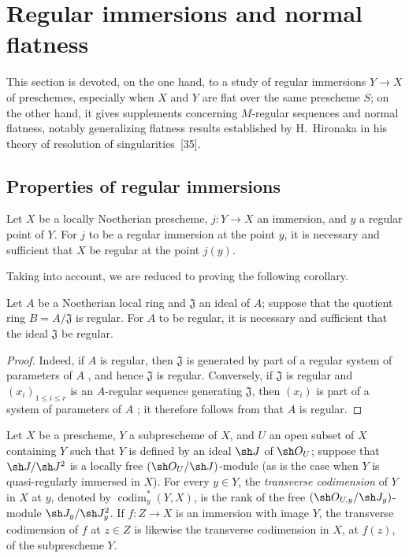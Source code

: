 \section{Regular immersions and normal flatness}
\label{section:IV.19}

This section is devoted, on the one hand, to a study of regular immersions  $Y\to X$ of preschemes, especially when $X$ and $Y$ are flat over the same prescheme $S$; on the other hand, it gives supplements concerning $M$-regular sequences and normal flatness, notably generalizing flatness results established by H.~Hironaka in his theory of resolution of singularities~[35].


\subsection{Properties of regular immersions}
\label{subsection:IV.19.1}


\begin{proposition}[19.1.1]
\label{IV.19.1.1}
Let $X$ be a locally Noetherian prescheme, $j:Y\to X$ an immersion, and $y$ a regular point of $Y$. For $j$ to be a regular immersion at the point $y$, it is necessary and sufficient that $X$ be regular at the point $j(y)$.
\end{proposition}

Taking  into account, we are reduced to proving the following corollary.

\begin{corollary}[19.1.2]
\label{IV.19.1.2}
Let $A$ be a Noetherian local ring and $\mathfrak J$ an ideal of $A$; suppose that the quotient ring $B=A/\mathfrak J$ is regular. For $A$ to be regular, it is necessary and sufficient that the ideal $\mathfrak J$ be regular.
\end{corollary}

\begin{proof}
Indeed, if $A$ is regular, then $\mathfrak J$ is generated by part of a regular system of parameters of $A$ , and hence $\mathfrak J$ is regular. Conversely, if $\mathfrak J$ is regular and $(x_i)_{1\leq i\leq r}$ is an $A$-regular sequence generating $\mathfrak J$, then $(x_i)$ is part of a system of parameters of $A$ ; it therefore follows from  that $A$ is regular.
\end{proof}

\begin{definition}[19.1.3]
\label{IV.19.1.3}
Let $X$ be a prescheme, $Y$ a subprescheme of $X$, and $U$ an open subset of $X$ containing $Y$ such that $Y$ is defined by an ideal $\sh J$ of $\sh O_U$; suppose that $\sh J/\sh J^2$ is a locally free $(\sh O_U/\sh J)$-module (as is the case when $Y$ is quasi-regularly immersed in $X$). For every $y\in Y$, the \emph{transverse codimension} of $Y$ in $X$ at $y$, denoted by $\operatorname{codim}_y^*(Y,X)$, is the rank of the free $(\sh O_{U,y}/\sh J_y)$-module $\sh J_y/\sh J_y^2$. If $f:Z\to X$ is an immersion with image $Y$, the transverse codimension of $f$ at $z\in Z$ is likewise the transverse codimension in $X$, at $f(z)$, of the subprescheme $Y$.
\end{definition}


